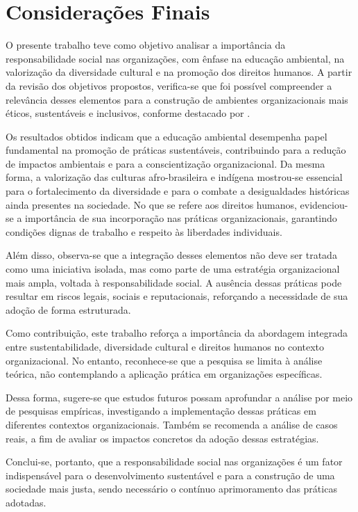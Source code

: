 \documentclass[
    12pt
    ,oneside
    ,a4paper
    ,chapter=TITLE
    ,section=TITLE
    ,sumario=abnt-6027-2012]{abntex2}
\begin{document}
\chapter{Considerações Finais}

O presente trabalho teve como objetivo analisar a importância da responsabilidade social nas organizações, com ênfase na educação ambiental, na valorização da diversidade cultural e na promoção dos direitos humanos. A partir da revisão dos objetivos propostos, verifica-se que foi possível compreender a relevância desses elementos para a construção de ambientes organizacionais mais éticos, sustentáveis e inclusivos, conforme destacado por .

Os resultados obtidos indicam que a educação ambiental desempenha papel fundamental na promoção de práticas sustentáveis, contribuindo para a redução de impactos ambientais e para a conscientização organizacional. Da mesma forma, a valorização das culturas afro-brasileira e indígena mostrou-se essencial para o fortalecimento da diversidade e para o combate a desigualdades históricas ainda presentes na sociedade. No que se refere aos direitos humanos, evidenciou-se a importância de sua incorporação nas práticas organizacionais, garantindo condições dignas de trabalho e respeito às liberdades individuais.

Além disso, observa-se que a integração desses elementos não deve ser tratada como uma iniciativa isolada, mas como parte de uma estratégia organizacional mais ampla, voltada à responsabilidade social. A ausência dessas práticas pode resultar em riscos legais, sociais e reputacionais, reforçando a necessidade de sua adoção de forma estruturada.

Como contribuição, este trabalho reforça a importância da abordagem integrada entre sustentabilidade, diversidade cultural e direitos humanos no contexto organizacional. No entanto, reconhece-se que a pesquisa se limita à análise teórica, não contemplando a aplicação prática em organizações específicas.

Dessa forma, sugere-se que estudos futuros possam aprofundar a análise por meio de pesquisas empíricas, investigando a implementação dessas práticas em diferentes contextos organizacionais. Também se recomenda a análise de casos reais, a fim de avaliar os impactos concretos da adoção dessas estratégias.

Conclui-se, portanto, que a responsabilidade social nas organizações é um fator indispensável para o desenvolvimento sustentável e para a construção de uma sociedade mais justa, sendo necessário o contínuo aprimoramento das práticas adotadas.


\postextual


\end{document}
